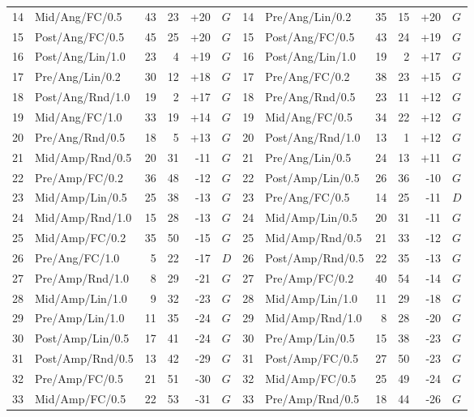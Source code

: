 \begin{table}[!t]
\begin{tabular}{rlrrrlrlrrrl}
14 & Mid/Ang/FC/0.5 & 43 & 23 & +20 & $G$ & 14 & Pre/Ang/Lin/0.2 & 35 & 15 & +20 & $G$ \\
15 & Post/Ang/FC/0.5 & 45 & 25 & +20 & $G$ & 15 & Post/Ang/FC/0.5 & 43 & 24 & +19 & $G$ \\
16 & Post/Ang/Lin/1.0 & 23 & 4 & +19 & $G$ & 16 & Post/Ang/Lin/1.0 & 19 & 2 & +17 & $G$ \\
17 & Pre/Ang/Lin/0.2 & 30 & 12 & +18 & $G$ & 17 & Pre/Ang/FC/0.2 & 38 & 23 & +15 & $G$ \\
18 & Post/Ang/Rnd/1.0 & 19 & 2 & +17 & $G$ & 18 & Pre/Ang/Rnd/0.5 & 23 & 11 & +12 & $G$ \\
19 & Mid/Ang/FC/1.0 & 33 & 19 & +14 & $G$ & 19 & Mid/Ang/FC/0.5 & 34 & 22 & +12 & $G$ \\
20 & Pre/Ang/Rnd/0.5 & 18 & 5 & +13 & $G$ & 20 & Post/Ang/Rnd/1.0 & 13 & 1 & +12 & $G$ \\
21 & Mid/Amp/Rnd/0.5 & 20 & 31 & -11 & $G$ & 21 & Pre/Ang/Lin/0.5 & 24 & 13 & +11 & $G$ \\
22 & Pre/Amp/FC/0.2 & 36 & 48 & -12 & $G$ & 22 & Post/Amp/Lin/0.5 & 26 & 36 & -10 & $G$ \\
23 & Mid/Amp/Lin/0.5 & 25 & 38 & -13 & $G$ & 23 & Pre/Ang/FC/0.5 & 14 & 25 & -11 & $D$ \\
24 & Mid/Amp/Rnd/1.0 & 15 & 28 & -13 & $G$ & 24 & Mid/Amp/Lin/0.5 & 20 & 31 & -11 & $G$ \\
25 & Mid/Amp/FC/0.2 & 35 & 50 & -15 & $G$ & 25 & Mid/Amp/Rnd/0.5 & 21 & 33 & -12 & $G$ \\
26 & Pre/Ang/FC/1.0 & 5 & 22 & -17 & $D$ & 26 & Post/Amp/Rnd/0.5 & 22 & 35 & -13 & $G$ \\
27 & Pre/Amp/Rnd/1.0 & 8 & 29 & -21 & $G$ & 27 & Pre/Amp/FC/0.2 & 40 & 54 & -14 & $G$ \\
28 & Mid/Amp/Lin/1.0 & 9 & 32 & -23 & $G$ & 28 & Mid/Amp/Lin/1.0 & 11 & 29 & -18 & $G$ \\
29 & Pre/Amp/Lin/1.0 & 11 & 35 & -24 & $G$ & 29 & Mid/Amp/Rnd/1.0 & 8 & 28 & -20 & $G$ \\
30 & Post/Amp/Lin/0.5 & 17 & 41 & -24 & $G$ & 30 & Pre/Amp/Lin/0.5 & 15 & 38 & -23 & $G$ \\
31 & Post/Amp/Rnd/0.5 & 13 & 42 & -29 & $G$ & 31 & Post/Amp/FC/0.5 & 27 & 50 & -23 & $G$ \\
32 & Pre/Amp/FC/0.5 & 21 & 51 & -30 & $G$ & 32 & Mid/Amp/FC/0.5 & 25 & 49 & -24 & $G$ \\
33 & Mid/Amp/FC/0.5 & 22 & 53 & -31 & $G$ & 33 & Pre/Amp/Rnd/0.5 & 18 & 44 & -26 & $G$ \\

\end{tabular}
\end{table}
